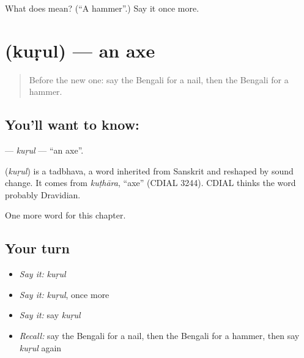 \begin{tcolorbox}[breakable,colback=teal!4,colframe=teal!35!black,title={Before you move on}]
What does  mean? (\textquotedblleft{}A hammer\textquotedblright{}.) Say it once more.
\end{tcolorbox}
\section[\texorpdfstring{\bn{কুড়ুল} (kuṛul)}{কুড়ুল (kuṛul)}]{ (kuṛul) — an axe}

\label{lesson:BN-C111-kurul}



\begin{quote}
Before the new one: say the Bengali for a nail, then the Bengali for a hammer.
\end{quote}

\subsection*{You'll want to know: }
\textbf{} — \emph{kuṛul} — \textquotedblleft{}an axe\textquotedblright{}.

\begin{cousinweb}
\textbf{} (\emph{kuṛul}) is a tadbhava, a word inherited from Sanskrit and reshaped by sound change. It comes from \emph{kuṭhāra}, \textquotedblleft{}axe\textquotedblright{} (CDIAL 3244). CDIAL thinks the word probably Dravidian.
\end{cousinweb}

\begin{grammarlens}[title={What you've built}]
One more word for this chapter.
\end{grammarlens}

\subsection*{Your turn}
\begin{itemize}
\raggedright
  \item \emph{Say it:} \emph{kuṛul}
  \item \emph{Say it:} \emph{kuṛul}, once more
  \item \emph{Say it:} say \emph{kuṛul}
  \item \emph{Recall:} say the Bengali for a nail, then the Bengali for a hammer, then say \emph{kuṛul} again
\end{itemize}

